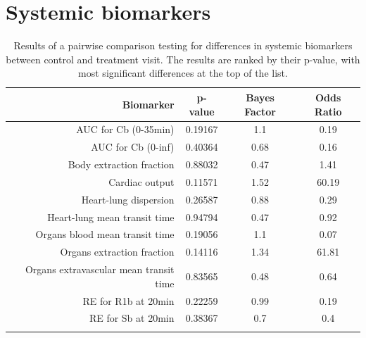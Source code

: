 \documentclass{epflreport}%
\begin{document}
\section{Systemic biomarkers}%
\label{sec:Systemicbiomarkers}%

%
\begin{longtable}{rccc}%
\hline%
Biomarker&p{-}value&Bayes Factor&Odds Ratio\\%
\hline%
AUC for Cb (0{-}35min)&0.19167&1.1&0.19\\%
AUC for Cb (0{-}inf)&0.40364&0.68&0.16\\%
Body extraction fraction&0.88032&0.47&1.41\\%
Cardiac output&0.11571&1.52&60.19\\%
Heart{-}lung dispersion&0.26587&0.88&0.29\\%
Heart{-}lung mean transit time&0.94794&0.47&0.92\\%
Organs blood mean transit time&0.19056&1.1&0.07\\%
Organs extraction fraction&0.14116&1.34&61.81\\%
Organs extravascular mean transit time&0.83565&0.48&0.64\\%
RE for R1b at 20min&0.22259&0.99&0.19\\%
RE for Sb at 20min&0.38367&0.7&0.4\\%
\hline%
\caption{Results of a pairwise comparison testing for differences in systemic biomarkers between control and treatment visit. The results are ranked by their p-value, with most significant differences at the top of the list.} \\%
\end{longtable}%
\end{document}
